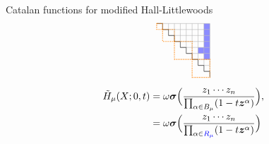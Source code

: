 \documentclass[dvipsnames]{beamer}
\newcommand{\zz}{{\boldsymbol z}}
\newcommand{\sigmabold}{\boldsymbol \sigma}
\newcommand{\Htild}{\tilde{H}}
\theoremstyle{definition}
\newcommand{\qtrootcolor}{blue!45}
\newcommand{\colorb}[1]{\textcolor{blue}{#1}}
\begin{document}
\begin{frame}{Catalan functions for modified Hall-Littlewoods}
\begin{align*}
\begin{tikzpicture}[scale=.213]
 \draw[draw = none, fill = \qtrootcolor] (8,-5) rectangle (9,-6);
 \draw[draw = none, fill = \qtrootcolor] (9,-1) rectangle (10,-2);
 \draw[draw = none, fill = \qtrootcolor] (9,-2) rectangle (10,-3);
 \draw[draw = none, fill = \qtrootcolor] (9,-3) rectangle (10,-4);
 \draw[draw = none, fill = \qtrootcolor] (9,-4) rectangle (10,-5);
 \draw[draw = none, fill = \qtrootcolor] (9,-5) rectangle (10,-6);
 \draw[draw = none, fill = \qtrootcolor] (9,-6) rectangle (10,-7);
 \draw[thin, black!31] (1,-1) -- (10,-1);
\draw[thin, black!31] (2,-1) -- (2,-1);
\draw[thin, black!31] (2,-2) -- (10,-2);
\draw[thin, black!31] (3,-2) -- (3,-1);
\draw[thin, black!31] (3,-3) -- (10,-3);
\draw[thin, black!31] (4,-3) -- (4,-1);
\draw[thin, black!31] (4,-4) -- (10,-4);
\draw[thin, black!31] (5,-4) -- (5,-1);
\draw[thin, black!31] (5,-5) -- (10,-5);
\draw[thin, black!31] (6,-5) -- (6,-1);
\draw[thin, black!31] (6,-6) -- (10,-6);
\draw[thin, black!31] (7,-6) -- (7,-1);
\draw[thin, black!31] (7,-7) -- (10,-7);
\draw[thin, black!31] (8,-7) -- (8,-1);
\draw[thin, black!31] (8,-8) -- (10,-8);
\draw[thin, black!31] (9,-8) -- (9,-1);
\draw[thin, black!31] (9,-9) -- (10,-9);
\draw[thin, black!31] (10,-9) -- (10,-1);
 \draw[thin] (1,-1) -- (2,-1);
\draw[thin] (2,-1) -- (2,-2);
\draw[thin] (2,-2) -- (3,-2);
\draw[thin] (3,-2) -- (3,-3);
\draw[thin] (3,-3) -- (4,-3);
\draw[thin] (4,-3) -- (4,-4);
\draw[thin] (4,-4) -- (5,-4);
\draw[thin] (5,-4) -- (5,-5);
\draw[thin] (5,-5) -- (6,-5);
\draw[thin] (6,-5) -- (6,-6);
\draw[thin] (6,-6) -- (7,-6);
\draw[thin] (7,-6) -- (7,-7);
\draw[thin] (7,-7) -- (8,-7);
\draw[thin] (8,-7) -- (8,-8);
\draw[thin] (8,-8) -- (9,-8);
\draw[thin] (9,-8) -- (9,-9);
\draw[thin] (9,-9) -- (10,-9);
\draw[thin] (10,-9) -- (10,-10);
\draw[thick, densely dotted, orange] (1,-1) rectangle (2,-2);
\draw[thick, densely dotted, orange] (2,-2) rectangle (4,-4);
\draw[thick, densely dotted, orange] (4,-4) rectangle (7,-7);
\draw[thick, densely dotted, orange] (7,-7) rectangle (10,-10);
\end{tikzpicture}
\end{align*}
\vspace{-0.5cm}
\pause
 \begin{align*}
\Htild_\mu(X;0,t) & = \omega \sigmabold
\Big( \frac{z_1\cdots z_n}{\prod_{\alpha \in
B_\mu}(1 - t \zz^\alpha)} 
                    \Big),\\
   & =
 \omega \sigmabold
\Big( \frac{z_1\cdots z_n}{\prod_{\alpha \in
\colorb{R_\mu}}(1 - t \zz^\alpha)} 
                    \Big)
\end{align*}
\end{frame}
\end{document}
